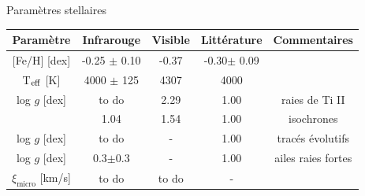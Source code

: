 \documentclass[10pt]{beamer}
\begin{document}
\begin{frame}[fragile]{Paramètres stellaires}
    \begin{table}[h!]
        \begin{center}
            \renewcommand{\arraystretch}{1.5}
            \begin{tabular}{c|ccc|c}
                Paramètre & Infrarouge &Visible& Littérature &Commentaires\\
                \hline
                
                $[$Fe/H$]$ [dex]& -0.25 $\pm$ 0.10 & -0.37 &
                -0.30$\pm$ 0.09&\\
                T$_{\rm eff}$ [K] & 4000 $\pm$ 125 &4307 & 4000& \\
    
                log $g$ [dex]& to do & 2.29 & 1.00&raies de Ti II\\
                \arrayrulecolor{red}\hline
                \multicolumn{1}{|c}{log $g$ [dex]}& 1.04 & 1.54 & 1.00 &\multicolumn{1}{c|}{isochrones}\\
                  \arrayrulecolor{red}\hline
                log $g$ [dex]& to do & - & 1.00 &tracés évolutifs\\
                log $g$ [dex]& 0.3$\pm$0.3 &-& 1.00 &ailes raies fortes\\
                $\xi_{\text{micro}}$ [km/s]& to do & to do & - &\\
            \end{tabular}
        \end{center}
    \end{table}
    \end{frame}
\end{document}
